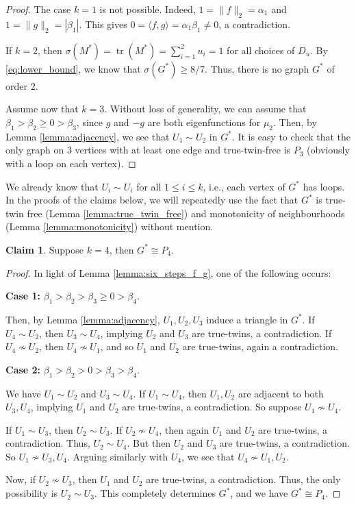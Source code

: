 \documentclass[11pt]{article}
\theoremstyle{plain}
\theoremstyle{definition}
\newtheorem{claim}{Claim}[section]
\numberwithin{equation}{section}
\DeclareMathOperator{\tr}{tr}
\begin{document}
\begin{proof}
The case $k=1$ is not possible. Indeed, $1 = \| f\|_2 = \alpha_1$ and $1 = \| g\|_2 = |\beta_1|$. 
This gives $0 = \langle f,g\rangle = \alpha_1\beta_1 \neq 0$, a contradiction. 

If $k=2$, then $\sigma(M^*) = \tr(M^*) = \sum_{i=1}^2 u_i = 1$ for all choices of $D_u$. 
By \eqref{eq:lower_bound}, we know that $\sigma(G^*)\geq 8/7$. Thus, there is no graph $G^*$ of order $2$. 

Assume now that $k=3$. Without loss of generality, we can assume that $\beta_1 > \beta_2 \geq 0 > \beta_3$, 
since $g$ and $-g$ are both eigenfunctions for $\mu_2$. Then, by Lemma \ref{lemma:adjacency}, 
we see that $U_1\sim U_2$ in $G^*$. It is easy to check that the only graph on $3$ vertices 
with at least one edge and true-twin-free is $P_3$ (obviously with a loop on each vertex). 
\end{proof}

We already know that $U_i\sim U_i$ for all $1\le i\le k$, i.e., each vertex of $G^*$ has loops. 
In the proofs of the claims below, we will repeatedly use the fact that $G^*$ is true-twin free 
(Lemma \ref{lemma:true_twin_free}) and monotonicity of neighbourhoods (Lemma \ref{lemma:monotonicity}) without mention.

\begin{claim} 
Suppose $k = 4$, then $G^* \cong P_4$.    
\end{claim}

\begin{proof} In light of Lemma \ref{lemma:six_steps_f_g}, one of the following occurs:

\textbf{Case 1:} $\beta_1 > \beta_2 > \beta_3\ge 0 > \beta_4$.

Then, by Lemma \ref{lemma:adjacency}, $U_1, U_2, U_3$ induce a triangle in $G^*$. If $U_4\sim U_2$, 
then $U_3\sim U_4$, implying $U_2$ and $U_3$ are true-twins, a contradiction. If $U_4\nsim U_2$, 
then $U_4\nsim U_1$, and so $U_1$ and $U_2$ are true-twins, again a contradiction.

\textbf{Case 2:} $\beta_1 > \beta_2 > 0 > \beta_3 > \beta_4$.

We have $U_1\sim U_2$ and $U_3\sim U_4$. If $U_1\sim U_4$, then $U_1, U_2$ are adjacent to 
both $U_3, U_4$, implying $U_1$ and $U_2$ are true-twins, a contradiction. So suppose $U_1\nsim U_4$. 

If $U_1\sim U_3$, then $U_2\sim U_3$. If $U_2\nsim U_4$, then again $U_1$ and $U_2$ are true-twins, 
a contradiction. Thus, $U_2\sim U_4$. But then $U_2$ and $U_3$ are true-twins, a contradiction. 
So $U_1\nsim U_3, U_4$. Arguing similarly with $U_4$, we see that $U_4\nsim U_1, U_2$. 

Now, if $U_2\nsim U_3$, then $U_1$ and $U_2$ are true-twins, a contradiction. Thus, the only 
possibility is $U_2\sim U_3$. This completely determines $G^*$, and we have $G^*\cong P_4$. 
\end{proof}
\end{document}
